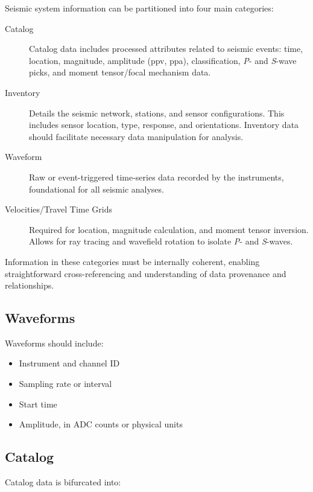 Seismic system information can be partitioned into four main categories:

\begin{description}
    \item[Catalog] Catalog data includes processed attributes related to seismic events: time, location, magnitude, amplitude (\gls{ppv}, \gls{ppa}), classification, \textit{P}- and \textit{S}-wave picks, and moment tensor/focal mechanism data.
    
    \item[Inventory] Details the seismic network, stations, and sensor configurations. This includes sensor location, type, response, and orientations. Inventory data should facilitate necessary data manipulation for analysis.
    
    \item[Waveform] Raw or event-triggered time-series data recorded by the instruments, foundational for all seismic analyses.
    
    \item[Velocities/Travel Time Grids] Required for location, magnitude calculation, and moment tensor inversion. Allows for ray tracing and wavefield rotation to isolate \textit{P}- and \textit{S}-waves.
\end{description}

Information in these categories must be internally coherent, enabling straightforward cross-referencing and understanding of data provenance and relationships.

\subsection{Waveforms}

Waveforms should include:

\begin{itemize}
    \item Instrument and channel ID
    \item Sampling rate or interval
    \item Start time
    \item Amplitude, in ADC counts or physical units
\end{itemize}

\subsection{Catalog}

Catalog data is bifurcated into:


